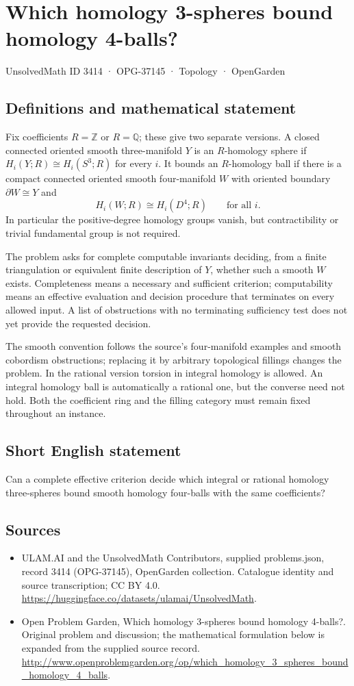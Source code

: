 \documentclass[11pt,a4paper]{article}
\begin{document}
\section*{Which homology 3-spheres bound homology 4-balls?}\label{3414}
{\small UnsolvedMath ID 3414 · OPG-37145 · Topology · OpenGarden}
\subsection{Definitions and mathematical statement}
Fix coefficients $R=\mathbb Z$ or $R=\mathbb Q$; these give two
separate versions. A closed connected oriented smooth three-manifold
$Y$ is an $R$-homology sphere if
$H_i(Y;R)\cong H_i(S^3;R)$ for every $i$. It bounds an
$R$-homology ball if there is a compact connected oriented smooth
four-manifold $W$ with oriented boundary $\partial W\cong Y$ and
\[
               H_i(W;R)\cong H_i(D^4;R)\qquad\text{for all }i.
\]
In particular the positive-degree homology groups vanish, but
contractibility or trivial fundamental group is not required.

The problem asks for complete computable invariants deciding, from
a finite triangulation or equivalent finite description of $Y$,
whether such a smooth $W$ exists. Completeness means a necessary
and sufficient criterion; computability means an effective evaluation
and decision procedure that terminates on every allowed input.
A list of obstructions with no terminating sufficiency test does
not yet provide the requested decision.

The smooth convention follows the source's four-manifold examples
and smooth cobordism obstructions; replacing it by arbitrary
topological fillings changes the problem. In the rational version
torsion in integral homology is allowed. An integral homology ball
is automatically a rational one, but the converse need not hold.
Both the coefficient ring and the filling category must remain fixed
throughout an instance.
\subsection{Short English statement}
Can a complete effective criterion decide which integral or rational homology three-spheres bound smooth homology four-balls with the same coefficients?
\subsection{Sources}
\begin{itemize}
\item[S1] ULAM.AI and the UnsolvedMath Contributors, supplied problems.json, record 3414 (OPG-37145), OpenGarden collection. Catalogue identity and source transcription; CC BY 4.0.
\url{https://huggingface.co/datasets/ulamai/UnsolvedMath}.
\item[S2] Open Problem Garden, Which homology 3-spheres bound homology 4-balls?. Original problem and discussion; the mathematical formulation below is expanded from the supplied source record.
\url{http://www.openproblemgarden.org/op/which_homology_3_spheres_bound_homology_4_balls}.
\end{itemize}
\end{document}
